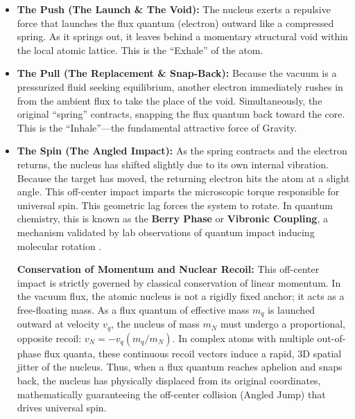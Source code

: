 \documentclass[11pt, a4paper]{article}
\begin{document}
\begin{itemize}
  \item \textbf{The Push (The Launch \& The Void):} The nucleus exerts a repulsive force that launches the flux quantum (electron) outward like a compressed spring. As it springs out, it leaves behind a momentary structural void within the local atomic lattice. This is the ``Exhale'' of the atom.
  
  \item \textbf{The Pull (The Replacement \& Snap-Back):} Because the vacuum is a pressurized fluid seeking equilibrium, another electron immediately rushes in from the ambient flux to take the place of the void. Simultaneously, the original ``spring'' contracts, snapping the flux quantum back toward the core. This is the ``Inhale''---the fundamental attractive force of Gravity.
  
  \item \textbf{The Spin (The Angled Impact):} As the spring contracts and the electron returns, the nucleus has shifted slightly due to its own internal vibration. Because the target has moved, the returning electron hits the atom at a slight angle. This off-center impact imparts the microscopic torque responsible for universal spin. This geometric lag forces the system to rotate. In quantum chemistry, this is known as the \textbf{Berry Phase} or \textbf{Vibronic Coupling}, a mechanism validated by lab observations of quantum impact inducing molecular rotation \cite{faure2001}.

  \textbf{Conservation of Momentum and Nuclear Recoil:} This off-center impact is strictly governed by classical conservation of linear momentum. In the vacuum flux, the atomic nucleus is not a rigidly fixed anchor; it acts as a free-floating mass. As a flux quantum of effective mass $m_q$ is launched outward at velocity $v_q$, the nucleus of mass $m_N$ must undergo a proportional, opposite recoil: $v_N = -v_q (m_q / m_N)$. In complex atoms with multiple out-of-phase flux quanta, these continuous recoil vectors induce a rapid, 3D spatial jitter of the nucleus. Thus, when a flux quantum reaches aphelion and snaps back, the nucleus has physically displaced from its original coordinates, mathematically guaranteeing the off-center collision (Angled Jump) that drives universal spin.
\end{itemize}
\end{document}

